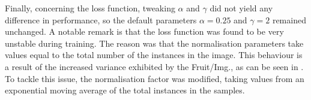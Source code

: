 Finally, concerning the loss function, tweaking $\alpha$ and $\gamma$ did not yield any difference in performance, so the default parameters $\alpha=0.25$ and $\gamma=2$ remained unchanged. A notable remark is that the loss function was found to be very unstable during training. The reason was that the normalisation parameters take values equal to the total number of the instances in the image. This behaviour is a result of the increased variance exhibited by the Fruit/Img., as can be seen in . To tackle this issue, the normalisation factor was modified, taking values from an exponential moving average of the total instances in the samples.

\vfill
 \begin{table}[!h]
  \centering
\end{table}
